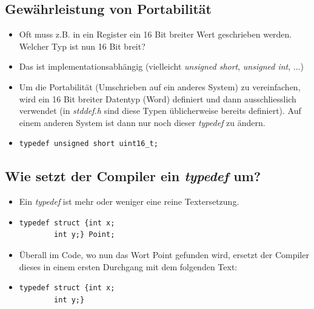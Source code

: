 \subsection{Gewährleistung von Portabilität}
\begin{itemize}
	\item Oft muss z.B. in ein Register ein 16 Bit breiter Wert geschrieben werden. Welcher Typ ist nun 16 Bit breit?
	\item Das ist implementationsabhängig (vielleicht \emph{unsigned short}, \emph{unsigned int}, ...)
	\item Um die Portabilität (Umschrieben auf ein anderes System) zu vereinfachen, wird ein 16 Bit breiter Datentyp (Word) definiert und dann ausschliesslich verwendet (in \emph{stddef.h} sind diese Typen üblicherweise bereits definiert). Auf einem anderen System ist dann nur noch dieser \emph{typedef} zu ändern.
	\item[\-] 
\vspace{-\baselineskip}
\begin{minipage}{0.45\linewidth}
\begin{lstlisting}
typedef unsigned short uint16_t;
\end{lstlisting}
\end{minipage}
\end{itemize}

\subsection{Wie setzt der Compiler ein \emph{typedef} um?}
\begin{itemize}
	\item Ein \emph{typedef} ist mehr oder weniger eine reine Textersetzung.
	\item[\-]
\vspace{-\baselineskip}
\begin{minipage}{0.3\linewidth}
\begin{lstlisting}
typedef struct {int x;
		int y;} Point;
\end{lstlisting}
\end{minipage}
	\item Überall im Code, wo nun das Wort Point gefunden wird, ersetzt der Compiler dieses in einem ersten Durchgang mit dem folgenden Text:
	\item[\-]
\noindent
\begin{minipage}{0.3\linewidth}
\begin{lstlisting}
typedef struct {int x;
		int y;}
\end{lstlisting}
\end{minipage}	
\end{itemize}

